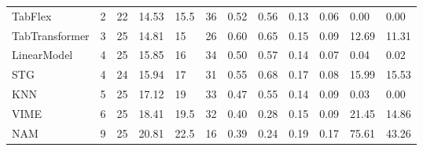 \begin{tabular}{lllllrllllll}
TabFlex & 2 & 22 & 14.53 & 15.5 & 36 & 0.52 & 0.56 & 0.13 & 0.06 & 0.00 & 0.00 \\
TabTransformer & 3 & 25 & 14.81 & 15 & 26 & 0.60 & 0.65 & 0.15 & 0.09 & 12.69 & 11.31 \\
LinearModel & 4 & 25 & 15.85 & 16 & 34 & 0.50 & 0.57 & 0.14 & 0.07 & 0.04 & 0.02 \\
STG & 4 & 24 & 15.94 & 17 & 31 & 0.55 & 0.68 & 0.17 & 0.08 & 15.99 & 15.53 \\
KNN & 5 & 25 & 17.12 & 19 & 33 & 0.47 & 0.55 & 0.14 & 0.09 & 0.03 & 0.00 \\
VIME & 6 & 25 & 18.41 & 19.5 & 32 & 0.40 & 0.28 & 0.15 & 0.09 & 21.45 & 14.86 \\
NAM & 9 & 25 & 20.81 & 22.5 & 16 & 0.39 & 0.24 & 0.19 & 0.17 & 75.61 & 43.26 \\
\bottomrule
\end{tabular}
